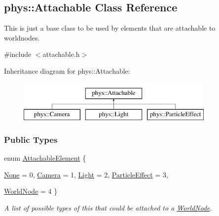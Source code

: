 \hypertarget{classphys_1_1Attachable}{
\subsection{phys::Attachable Class Reference}
\label{df/dbd/classphys_1_1Attachable}
}


This is just a base class to be used by elements that are attachable to worldnodes.  




{\ttfamily \#include $<$attachable.h$>$}

Inheritance diagram for phys::Attachable:\begin{figure}[H]
\begin{center}
\leavevmode
\includegraphics[height=2.000000cm]{df/dbd/classphys_1_1Attachable}
\end{center}
\end{figure}
\subsubsection*{Public Types}
\begin{DoxyCompactItemize}
\item 
enum \hyperlink{classphys_1_1Attachable_acd1fca033e7cc0bb3024a92d466d213a}{AttachableElement} \{ \par
\hyperlink{classphys_1_1Attachable_acd1fca033e7cc0bb3024a92d466d213aaca28a2a7b104d463288ef09731c26288}{None} =  0, 
\hyperlink{classphys_1_1Attachable_acd1fca033e7cc0bb3024a92d466d213aa8de5bba9ffca8ba85776e5a54eb26654}{Camera} =  1, 
\hyperlink{classphys_1_1Attachable_acd1fca033e7cc0bb3024a92d466d213aa33e8ea44892e656e8b94e744957c3aff}{Light} =  2, 
\hyperlink{classphys_1_1Attachable_acd1fca033e7cc0bb3024a92d466d213aa5bec8218f7c22f3cf4e54dbcef257657}{ParticleEffect} =  3, 
\par
\hyperlink{classphys_1_1Attachable_acd1fca033e7cc0bb3024a92d466d213aaff68a3a8303cf1b4fefc869c4d3a5367}{WorldNode} =  4
 \}
\begin{DoxyCompactList}\small\item\em A list of possible types of this that could be attached to a \hyperlink{classphys_1_1WorldNode}{WorldNode}. \item\end{DoxyCompactList}\end{DoxyCompactItemize}

